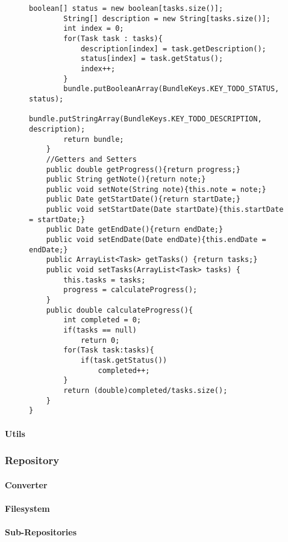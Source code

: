 \begin{figure}[H]
\begin{lstlisting}[caption=Todo (Joscha Nassenstein)]
        boolean[] status = new boolean[tasks.size()];
        String[] description = new String[tasks.size()];
        int index = 0;
        for(Task task : tasks){
            description[index] = task.getDescription();
            status[index] = task.getStatus();
            index++;
        }
        bundle.putBooleanArray(BundleKeys.KEY_TODO_STATUS, status);
        bundle.putStringArray(BundleKeys.KEY_TODO_DESCRIPTION, description);
        return bundle;
    }
    //Getters and Setters
    public double getProgress(){return progress;}
    public String getNote(){return note;}
    public void setNote(String note){this.note = note;}
    public Date getStartDate(){return startDate;}
    public void setStartDate(Date startDate){this.startDate = startDate;}
    public Date getEndDate(){return endDate;}
    public void setEndDate(Date endDate){this.endDate = endDate;}
    public ArrayList<Task> getTasks() {return tasks;}
    public void setTasks(ArrayList<Task> tasks) {
        this.tasks = tasks;
        progress = calculateProgress();
    }
    public double calculateProgress(){
        int completed = 0;
        if(tasks == null)
            return 0;
        for(Task task:tasks){
            if(task.getStatus())
                completed++;
        }
        return (double)completed/tasks.size();
    }
}
\end{lstlisting}
\end{figure}

		\paragraph{Utils}
	\subsubsection{Repository}
		\paragraph{Converter}
		\paragraph{Filesystem}
		\paragraph{Sub-Repositories}
